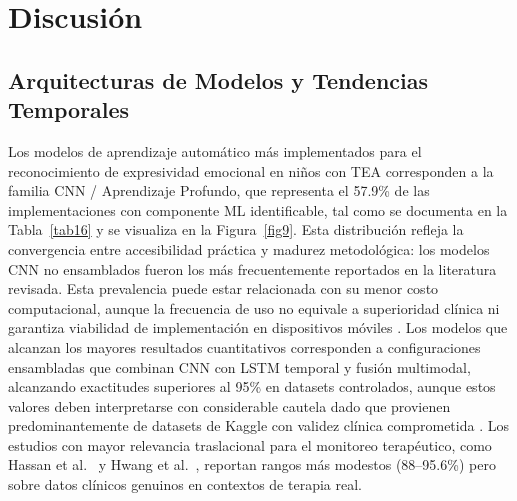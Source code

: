 \documentclass[3p,twocolumn,times]{elsarticle}
\begin{document}
	\section{Discusión}\label{sec6}
	
	\subsection{Arquitecturas de Modelos y Tendencias Temporales}\label{sec6a}
	
	Los modelos de aprendizaje automático más implementados para el reconocimiento de
	expresividad emocional en niños con TEA corresponden a la familia CNN / Aprendizaje
	Profundo, que representa el 57.9\% de las implementaciones con componente ML
	identificable, tal como se documenta en la Tabla~\ref{tab16} y se visualiza en la
	Figura~\ref{fig9}. Esta distribución refleja la convergencia entre accesibilidad
	práctica y madurez metodológica: los modelos CNN no ensamblados fueron los más
	frecuentemente reportados en la literatura revisada. Esta prevalencia puede estar
	relacionada con su menor costo computacional, aunque la frecuencia de uso no
	equivale a superioridad clínica ni garantiza viabilidad de implementación en
	dispositivos móviles \cite{Sholikah2024}. Los modelos que alcanzan los mayores
	resultados cuantitativos corresponden a configuraciones ensambladas que combinan
	CNN con LSTM temporal y fusión multimodal, alcanzando exactitudes superiores al
	95\% en datasets controlados, aunque estos valores deben interpretarse con
	considerable cautela dado que provienen predominantemente de datasets de Kaggle con
	validez clínica comprometida \cite{Aljbori2025,Ramachandran2025}. Los estudios con
	mayor relevancia traslacional para el monitoreo terapéutico, como Hassan et al.\
	\cite{Hassan2025} y Hwang et al.\ \cite{Hwang2024}, reportan rangos más modestos
	(88--95.6\%) pero sobre datos clínicos genuinos en contextos de terapia real.
	
\end{document}
